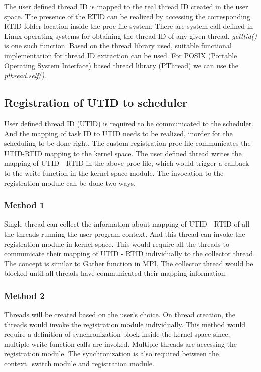 \documentclass[12pt]{article}
\begin{document}
The user defined thread ID is mapped to the real thread ID created in the user space. 
The presence of the RTID can be realized by accessing the corresponding RTID folder location inside the proc file system. 
There are system call defined in Linux operating systems for obtaining the thread ID of any given thread. 
\emph{getttid()} is one such function. 
Based on the thread library used, suitable functional implementation for thread ID extraction can be used. 
For POSIX (Portable Operating System Interface) based thread library (PThread) we can use the \emph{pthread.self()}.

\subsection*{Registration of UTID to scheduler}

User defined thread ID (UTID) is required to be communicated to the scheduler. 
And the mapping of task ID to UTID needs to be realized, inorder for the scheduling to be done right. 
The custom registration proc file communicates the UTID-RTID mapping to the kernel space. 
The user defined thread writes the mapping of UTID - RTID in the above proc file, which would trigger a callback to the write function in the kernel space module. 
The invocation to the registration module can be done two ways.

\subsubsection*{Method 1}

Single thread can collect the information about mapping of UTID - RTID of all the threads running the user program context. 
And this thread can invoke the registration module in kernel space. 
This would require all the threads to communicate their mapping of UTID - RTID individually to the collector thread. 
The concept is similar to Gather function in MPI. 
The collector thread would be blocked until all threads have communicated their mapping information. 

\subsubsection*{Method 2}

Threads will be created based on the user's choice. 
On thread creation, the threads would invoke the registration module individually. 
This method would require a definition of synchronization block inside the kernel space since, multiple write function calls are invoked. 
Multiple threads are accessing the registration module. 
The synchronization is also required between the context\_switch module and registration module.
\end{document}
